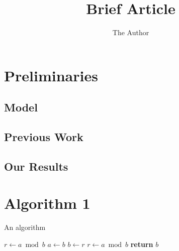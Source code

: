 \documentclass[11pt]{amsart}
\title{Brief Article}
\author{The Author}
\begin{document}
\maketitle
\section{Preliminaries}
\subsection{Model}

\subsection{Previous Work}

\subsection{Our Results}

\section{Algorithm 1}


\begin{algorithm}
  \caption{An algorithm}
  \begin{algorithmic}[1]
      \State $r \gets a \bmod b$
        \State $a \gets b$
        \State $b \gets r$
        \State $r \gets a \bmod b$
      \EndWhile\label{euclidendwhile}
      \State \textbf{return} $b$
    \EndProcedure
  \end{algorithmic}
\end{algorithm}
 
\end{document}
